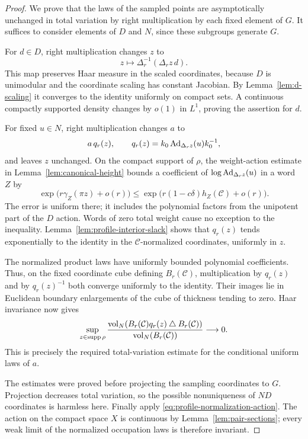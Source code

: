 \begin{proof}
We prove that the laws of the sampled points are asymptotically
unchanged in total variation by right multiplication by each fixed
element of $G$.  It suffices to consider elements of $D$ and $N$,
since these subgroups generate $G$.

For $d\in D$, right multiplication changes $z$ to
\[
 z\longmapsto\Delta_r^{-1}(\Delta_r z\,d).
\]
This map preserves Haar measure in the scaled coordinates, because
$D$ is unimodular and the coordinate scaling has constant Jacobian.
By Lemma~\ref{lem:d-scaling} it converges to the identity uniformly
on compact sets.  A continuous compactly supported density changes
by $o(1)$ in $L^1$, proving the assertion for $d$.

For fixed $u\in N$, right multiplication changes $a$ to
\[
 a\,q_r(z),\qquad
 q_r(z)=k_0\operatorname{Ad}_{\Delta_r z}(u)k_0^{-1},
\]
and leaves $z$ unchanged.  On the compact support of $\rho$, the
weight-action estimate in Lemma~\ref{lem:canonical-height} bounds a
coefficient of $\log\operatorname{Ad}_{\Delta_r z}(u)$ in a word $Z$ by
\[
 \exp\bigl(r\gamma_Z(\pi z)+o(r)\bigr)
 \le \exp\bigl(r(1-c\delta)h_Z(\mathcal C)+o(r)\bigr).
\]
The error is uniform there; it includes the polynomial factors from
the unipotent part of the $D$ action.  Words of zero total weight
cause no exception to the inequality.  Lemma~\ref{lem:profile-interior-slack}
shows that $q_r(z)$ tends exponentially to the identity in the
$\mathcal C$-normalized coordinates, uniformly in $z$.

The normalized product laws have uniformly bounded polynomial
coefficients.  Thus, on the fixed coordinate cube defining
$B_r(\mathcal C)$, multiplication by $q_r(z)$ and by $q_r(z)^{-1}$
both converge uniformly to the identity.  Their images lie in
Euclidean boundary enlargements of the cube of thickness tending
to zero.  Haar invariance now gives
\[
 \sup_{z\in\operatorname{supp}\rho}
 \frac{\operatorname{vol}_N(B_r(\mathcal C)q_r(z)
                     \mathbin{\triangle} B_r(\mathcal C))}
      {\operatorname{vol}_N(B_r(\mathcal C))}\longrightarrow0.
\]
This is precisely the required total-variation estimate for the
conditional uniform laws of $a$.

The estimates were proved before projecting the sampling coordinates
to $G$.  Projection decreases total variation, so the possible
nonuniqueness of $ND$ coordinates is harmless here.  Finally apply
\eqref{eq:profile-normalization-action}.  The action on the compact
space $X$ is continuous by Lemma~\ref{lem:pair-sections}; every weak
limit of the normalized occupation laws is therefore invariant.
\end{proof}

